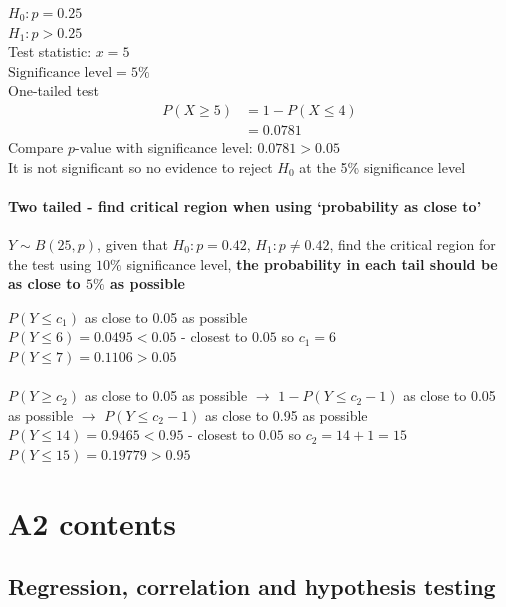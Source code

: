\documentclass[oneside,fleqn,11pt]{book}
\begin{document}
	\begin{solution}
		$H_0: p=0.25$\\
		$H_1:p>0.25$\\
		Test statistic: $x=5$\\
		$\text{Significance level} = 5\%$\\
		One-tailed test
		\begin{align*}
			P(X\geq 5) &= 1-P(X\leq 4) \\ &= 0.0781
		\end{align*}
		Compare $p$-value with significance level: $0.0781 > 0.05$\\
		It is not significant so no evidence to reject $H_0$ at the 5\% significance level
	\end{solution}
	
	\subsection{Two tailed - find critical region when using `probability as close to'}
	\begin{example}
		$Y \sim B(25, p)$, given that $H_0: p=0.42$, $H_1:p \neq 0.42$, find the critical region for the test using $10\%$ significance level, \textbf{the probability in each tail should be as close to $5\%$ as possible}
	\end{example}
	
	\begin{solution}
		$P(Y\leq c_1)$ as close to 0.05 as possible\\
		$P(Y\leq 6) = 0.0495 < 0.05$ - closest to $0.05$ so $c_1 = 6$\\
		$P(Y\leq 7) = 0.1106 > 0.05$\\\\
		
		$P(Y\geq c_2)$ as close to 0.05 as possible $\rightarrow$ $1-P(Y\leq c_2 -1)$ as close to 0.05 as possible $\rightarrow$ $P(Y\leq c_2 -1)$ as close to 0.95 as possible\\
		$P(Y\leq 14) = 0.9465 < 0.95$ - closest to $0.05$ so $c_2 = 14+1 = 15$\\
		$P(Y\leq 15) = 0.19779 > 0.95$
	\end{solution}
		
	
	\pagebreak
	
	\part{A2 contents}
	
	
	\chapter{Regression, correlation and hypothesis testing}
	
\end{document}

